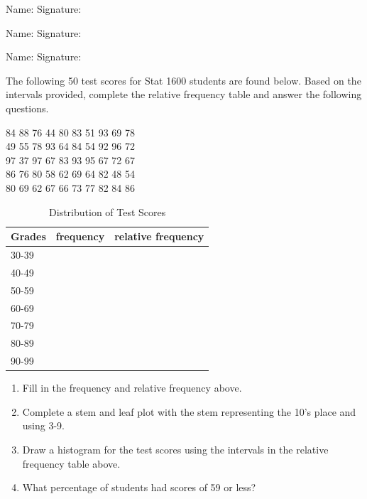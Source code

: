 \documentclass[11pt, chapterprefix=true]{scrbook}\usepackage[]{graphicx}\usepackage[]{color}
\begin{document}
\begin{exercises}
\begin{exercise}
\begin{center}
{{\vspace{4mm}
Name: \underline{\phantom{xxxxxxxxxxxxxxxxxxxxxxxx}} Signature: \underline{\phantom{xxxxxxxxxxxxxxxxxxxxxxxx}}

\vspace{4mm}
Name: \underline{\phantom{xxxxxxxxxxxxxxxxxxxxxxxx}} Signature: \underline{\phantom{xxxxxxxxxxxxxxxxxxxxxxxx}}

\vspace{4mm}
Name: \underline{\phantom{xxxxxxxxxxxxxxxxxxxxxxxx}} Signature: \underline{\phantom{xxxxxxxxxxxxxxxxxxxxxxxx}}
 }}
\end{center}

The following 50 test scores for Stat 1600 students are found below. Based on the intervals provided, complete the relative frequency table and answer the following questions.

84	88	76	44	80	83	51	93	69	78 \\
49	55	78	93	64	84	54	92	96	72 \\
97	37	97	67	83	93	95	67	72	67 \\
86	76	80	58	62	69	64	82	48	54 \\
80	69  62	67	66	73	77	82	84	86

\begin{table}[ht]
\centering
\caption{Distribution of Test Scores}
\begin{tabular}{@{} lcc @{}} \hline
Grades  & frequency & relative frequency \\ \hline
30-39 & & \\
40-49 & & \\
50-59 & & \\
60-69 & & \\
70-79 & & \\
80-89 & & \\
90-99 & & \\ \hline
\end{tabular}
\end{table}

\begin{enumerate}
  \item Fill in the frequency and relative frequency above.
  \item	Complete a stem and leaf plot with the stem representing the 10’s place and using 3-9.
  \item Draw a histogram for the test scores using the intervals in the relative frequency table above.
  \item	What percentage of students had scores of 59 or less?
\end{enumerate}


\end{exercise}
\end{exercises}
\end{document}

